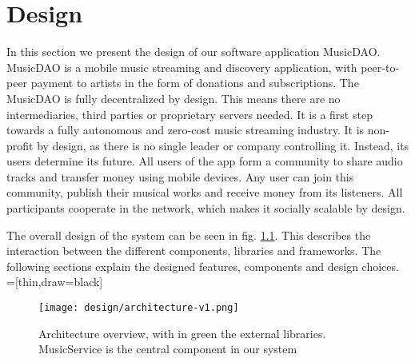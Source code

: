 \chapter{Design}
In this section we present the design of our software application MusicDAO. MusicDAO is a mobile music streaming and discovery application, with peer-to-peer payment to artists in the form of donations and subscriptions. The MusicDAO is fully decentralized by design. This means there are no intermediaries, third parties or proprietary servers needed. It is a first step towards a fully autonomous and zero-cost music streaming industry. It is non-profit by design, as there is no single leader or company controlling it. Instead, its users determine its future. All users of the app form a community to share audio tracks and transfer money using mobile devices. Any user can join this community, publish their musical works and receive money from its listeners. All participants cooperate in the network, which makes it socially scalable by design. %

The overall design of the system can be seen in fig. \ref{fig:architecture}. This describes the interaction between the different components, libraries and frameworks. The following sections explain the designed features, components and design choices.
\\

=[thin,draw=black]

\begin{figure}
    \centering
    \texttt{[image: design/architecture-v1.png]}
    \caption{Architecture overview, with in green the external libraries. MusicService is the central component in our system}
    \label{fig:architecture}
\end{figure}

